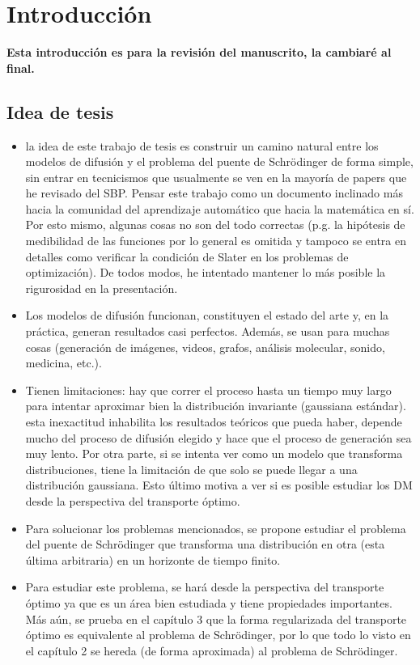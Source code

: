 \chapter*{Introducción}

\textbf{Esta introducción es para la revisión del manuscrito, la cambiaré al final.}

\section*{Idea de tesis}

\begin{itemize}
    \item la idea de este trabajo de tesis es construir un camino natural entre los modelos de difusión y el problema del puente de Schrödinger de forma simple, sin entrar en tecnicismos que usualmente se ven en la mayoría de papers que he revisado del SBP. Pensar este trabajo como un documento inclinado más hacia la comunidad del aprendizaje automático que hacia la matemática en sí. Por esto mismo, algunas cosas no son del todo correctas (p.g. la hipótesis de medibilidad de las funciones por lo general es omitida y tampoco se entra en detalles como verificar la condición de Slater en los problemas de optimización). De todos modos, he intentado mantener lo más posible la rigurosidad en la presentación.
    \item Los modelos de difusión funcionan, constituyen el estado del arte y, en la práctica, generan resultados casi perfectos. Además, se usan para muchas cosas (generación de imágenes, videos, grafos, análisis molecular, sonido, medicina, etc.).
    \item Tienen limitaciones: hay que correr el proceso hasta un tiempo muy largo para intentar aproximar bien la distribución invariante (gaussiana estándar). esta inexactitud inhabilita los resultados teóricos que pueda haber, depende mucho del proceso de difusión elegido y hace que el proceso de generación sea muy lento. Por otra parte, si se intenta ver como un modelo que transforma distribuciones, tiene la limitación de que solo se puede llegar a una distribución gaussiana. Esto último motiva a ver si es posible estudiar los DM desde la perspectiva del transporte óptimo.
    \item Para solucionar los problemas mencionados, se propone estudiar el problema del puente de Schrödinger que transforma una distribución en otra (esta última arbitraria) en un horizonte de tiempo finito.
    \item Para estudiar este problema, se hará desde la perspectiva del transporte óptimo ya que es un área bien estudiada y tiene propiedades importantes. Más aún, se prueba en el capítulo 3 que la forma regularizada del transporte óptimo es equivalente al problema de Schrödinger, por lo que todo lo visto en el capítulo 2 se hereda (de forma aproximada) al problema de Schrödinger.

\end{itemize}

